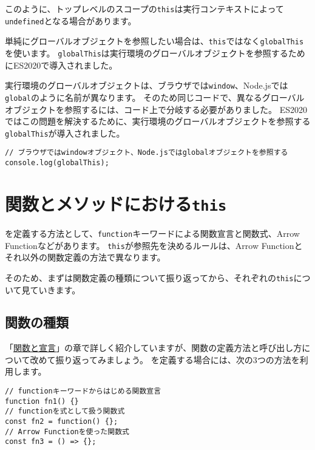このように、トップレベルのスコープの\texttt{this}は実行コンテキストによって\texttt{undefined}となる場合があります。

単純にグローバルオブジェクトを参照したい場合は、\texttt{this}ではなく\texttt{globalThis}を使います。
\texttt{globalThis}は実行環境のグローバルオブジェクトを参照するためにES2020で導入されました。

実行環境のグローバルオブジェクトは、ブラウザでは\texttt{window}、Node.jsでは\texttt{global}のように名前が異なります。
そのため同じコードで、異なるグローバルオブジェクトを参照するには、コード上で分岐する必要がありました。
ES2020ではこの問題を解決するために、実行環境のグローバルオブジェクトを参照する\texttt{globalThis}が導入されました。

\begin{lstlisting}
// ブラウザではwindowオブジェクト、Node.jsではglobalオブジェクトを参照する
console.log(globalThis);
\end{lstlisting}

\hypertarget{function-and-method-this}{%
\section{\texorpdfstring{関数とメソッドにおける\texttt{this}}{関数とメソッドにおけるthis}}\label{function-and-method-this}}

\textbf{}を定義する方法として、\texttt{function}キーワードによる関数宣言と関数式、Arrow
Functionなどがあります。
\texttt{this}が参照先を決めるルールは、Arrow
Functionとそれ以外の関数定義の方法で異なります。

そのため、まずは関数定義の種類について振り返ってから、それぞれの\texttt{this}について見ていきます。

\hypertarget{type-of-function}{%
\subsection{関数の種類}\label{type-of-function}}

「\hyperlink{function-and-declaration}{関数と宣言}」の章で詳しく紹介していますが、関数の定義方法と呼び出し方について改めて振り返ってみましょう。
\textbf{}を定義する場合には、次の3つの方法を利用します。

\begin{lstlisting}
// functionキーワードからはじめる関数宣言
function fn1() {}
// functionを式として扱う関数式
const fn2 = function() {};
// Arrow Functionを使った関数式
const fn3 = () => {};
\end{lstlisting}

